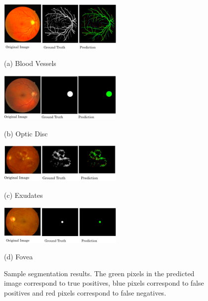\documentclass{article}
\begin{document}
\begin{figure}[!ht]
  \begin{minipage}[b]{0.7\linewidth}
  \centering
  \centerline{\includegraphics[width=6cm]{images/bv_prediction.png}}
  \centerline{(a) Blood Vessels}\medskip
  \end{minipage}

  \begin{minipage}[b]{0.7\linewidth}
  \centering
  \centerline{\includegraphics[width=6cm]{images/od.png}}
  \centerline{(b) Optic Disc}\medskip
  \end{minipage}

  \begin{minipage}[b]{0.7\linewidth}
  \centering
  \centerline{\includegraphics[width=6cm]{images/ex.png}}
  \centerline{(c) Exudates}\medskip
  \end{minipage}

  \begin{minipage}[b]{0.7\linewidth}
  \centering
  \centerline{\includegraphics[width=6cm]{images/fovea.png}}
  \centerline{(d) Fovea}\medskip
  \end{minipage}

  \caption{Sample segmentation results. The green pixels in the predicted image correspond to true positives, blue pixels correspond to false positives and  red pixels correspond to false negatives.}
  \label{fig:segmentation_results}

\end{figure}
\end{document}
